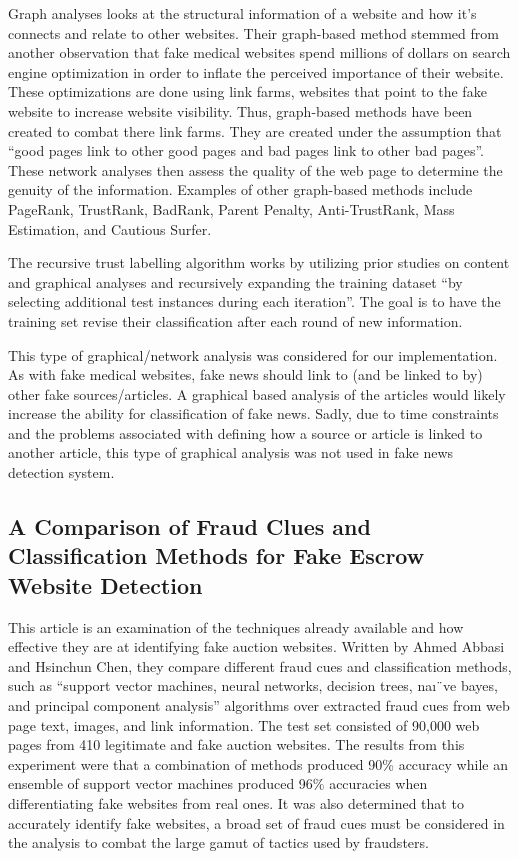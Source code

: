 \documentclass{eptcs}
\begin{document}
Graph analyses looks at the structural information of a website and how it’s connects and relate to other websites. Their graph-based method stemmed from another observation that fake medical websites spend millions of dollars on search engine optimization in order to inflate the perceived importance of their website. These optimizations are done using link farms, websites that point to the fake website to increase website visibility. Thus, graph-based methods have been created to combat there link farms. They are created under the assumption that “good pages link to other good pages and bad pages link to other bad pages”.  These network analyses then assess the quality of the web page to determine the genuity of the information. Examples of other graph-based methods include PageRank, TrustRank, BadRank, Parent Penalty, Anti-TrustRank, Mass Estimation, and Cautious Surfer. 

The recursive trust labelling algorithm works by utilizing prior studies on content and graphical analyses and recursively expanding the training dataset “by selecting additional test instances during each iteration”. The goal is to have the training set revise their classification after each round of new information.

This type of graphical/network analysis was considered for our implementation. As with fake medical websites, fake news should link to (and be linked to by) other fake sources/articles. A graphical based analysis of the articles would likely increase the ability for classification of fake news. Sadly, due to time constraints and the problems associated with defining how a source or article is linked to another article, this type of graphical analysis was not used in fake news detection system.

\subsection*{A Comparison of Fraud Clues and Classification Methods for Fake Escrow Website Detection}
This article is an examination of the techniques already available and how effective they are at identifying fake auction websites. Written by  Ahmed Abbasi and Hsinchun Chen, they compare different fraud cues and classification methods, such as “support vector machines, neural networks, decision trees, naı¨ve bayes, and principal component analysis” algorithms over extracted fraud cues from web page text, images, and link information. The test set consisted of 90,000 web pages from 410 legitimate and fake auction websites. The results from this experiment were that a combination of methods produced 90\% accuracy while an ensemble of support vector machines produced 96\% accuracies when differentiating fake websites from real ones. It was also determined that to accurately identify fake websites, a broad set of fraud cues must be considered in the analysis to combat the large gamut of tactics used by fraudsters. 
\end{document}
